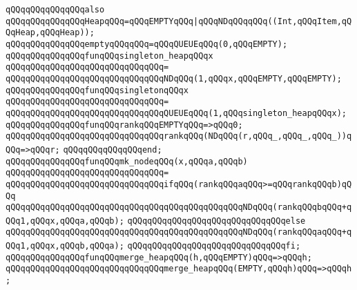 \newline
\verb|qQQqqQQqqQQqqQQqalso|\newline
\verb|qQQqqQQqqQQqqQQqHeapqQQq=qQQqEMPTYqQQq|\verb#|qQQqNDqQQqqQQq((Int,qQQqItem,qQQqHeap,qQQqHeap));#\newline
\newline
\verb|qQQqqQQqqQQqqQQqemptyqQQqqQQq=qQQqQUEUEqQQq(0,qQQqEMPTY);|\newline
\newline
\verb|qQQqqQQqqQQqqQQqfunqQQqsingleton_heapqQQqx|\newline
\verb|qQQqqQQqqQQqqQQqqQQqqQQqqQQqqQQq=|\newline
\verb|qQQqqQQqqQQqqQQqqQQqqQQqqQQqqQQqNDqQQq(1,qQQqx,qQQqEMPTY,qQQqEMPTY);|\newline
\newline
\verb|qQQqqQQqqQQqqQQqfunqQQqsingletonqQQqx|\newline
\verb|qQQqqQQqqQQqqQQqqQQqqQQqqQQqqQQq=|\newline
\verb|qQQqqQQqqQQqqQQqqQQqqQQqqQQqqQQqQUEUEqQQq(1,qQQqsingleton_heapqQQqx);|\newline
\newline
\verb|qQQqqQQqqQQqqQQqfunqQQqrankqQQqEMPTYqQQq=>qQQq0;|\newline
\verb|qQQqqQQqqQQqqQQqqQQqqQQqqQQqqQQqrankqQQq(NDqQQq(r,qQQq_,qQQq_,qQQq_))qQQq=>qQQqr;|\newline
\verb|qQQqqQQqqQQqqQQqend;|\newline
\newline
\verb|qQQqqQQqqQQqqQQqfunqQQqmk_nodeqQQq(x,qQQqa,qQQqb)|\newline
\verb|qQQqqQQqqQQqqQQqqQQqqQQqqQQqqQQq=|\newline
\verb|qQQqqQQqqQQqqQQqqQQqqQQqqQQqqQQqifqQQq(rankqQQqaqQQq>=qQQqrankqQQqb)qQQq|\newline
\verb|qQQqqQQqqQQqqQQqqQQqqQQqqQQqqQQqqQQqqQQqqQQqqQQqNDqQQq(rankqQQqbqQQq+qQQq1,qQQqx,qQQqa,qQQqb);|\newline
\verb|qQQqqQQqqQQqqQQqqQQqqQQqqQQqqQQqelse|\newline
\verb|qQQqqQQqqQQqqQQqqQQqqQQqqQQqqQQqqQQqqQQqqQQqqQQqNDqQQq(rankqQQqaqQQq+qQQq1,qQQqx,qQQqb,qQQqa);|\newline
\verb|qQQqqQQqqQQqqQQqqQQqqQQqqQQqqQQqfi;|\newline
\newline
\verb|qQQqqQQqqQQqqQQqfunqQQqmerge_heapqQQq(h,qQQqEMPTY)qQQq=>qQQqh;|\newline
\verb|qQQqqQQqqQQqqQQqqQQqqQQqqQQqqQQqmerge_heapqQQq(EMPTY,qQQqh)qQQq=>qQQqh;|\newline
